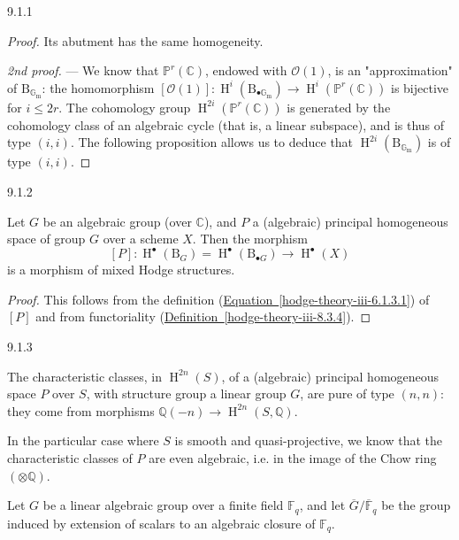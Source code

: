 \begin{theorem}{9.1.1}
\begin{proof}
      Its abutment has the same homogeneity.\par{}\emph{2nd proof.} —
      We know that \(\mathbb {P}^r(\mathbb {C})\), endowed with \(\mathcal {O}(1)\), is an "approximation" of \(\mathrm {B}_{\mathbb {G}_\mathrm {m}}\): the homomorphism \([\mathcal {O}(1)]\colon \operatorname {H}^i(\mathrm {B}_{\bullet \mathbb {G}_\mathrm {m}})\to \operatorname {H}^i(\mathbb {P}^r(\mathbb {C}))\) is bijective for \(i\leqslant  2r\).
      The cohomology group \(\operatorname {H}^{2i}(\mathbb {P}^r(\mathbb {C}))\) is generated by the cohomology class of an algebraic cycle (that is, a linear subspace), and is thus of type \((i,i)\).
      The following proposition allows us to deduce that \(\operatorname {H}^{2i}(\mathrm {B}_{\mathbb {G}_\mathrm {m}})\) is of type \((i,i)\).\end{proof}\end{theorem}\begin{proposition}{9.1.2}\label{hodge-theory-iii-9.1.2}\skipsinglepar\par{}Let \(G\) be an algebraic group (over \(\mathbb {C}\)), and \(P\) a (algebraic) principal homogeneous space of group \(G\) over a scheme \(X\).
    Then the morphism
    \[       [P]\colon \operatorname {H}^\bullet (\mathrm {B}_G)=\operatorname {H}^\bullet (\mathrm {B}_{\bullet  G})       \to  \operatorname {H}^\bullet (X)     \]
    is a morphism of mixed Hodge structures.\begin{proof}\par{}This follows from the definition (\hyperref[hodge-theory-iii-6.1.3.1]{Equation~\ref*{hodge-theory-iii-6.1.3.1}}) of \([P]\) and from functoriality (\hyperref[hodge-theory-iii-8.3.4]{Definition~\ref*{hodge-theory-iii-8.3.4}}).\end{proof}\end{proposition}\begin{corollary}{9.1.3}\label{hodge-theory-iii-9.1.3}\skipsinglepar\par{}The characteristic classes, in \(\operatorname {H}^{2n}(S)\), of a (algebraic) principal homogeneous space \(P\) over \(S\), with structure group a linear group \(G\), are pure of type \((n,n)\): they come from morphisms \(\mathbb {Q}(-n)\to \operatorname {H}^{2n}(S,\mathbb {Q})\).\end{corollary}\par{}In the particular case where \(S\) is smooth and quasi-projective, we know that the characteristic classes of \(P\) are even algebraic, i.e. in the image of the Chow ring \((\otimes \mathbb {Q})\).\label{hodge-theory-iii-9.1.4}\par{}Let \(G\) be a linear algebraic group over a finite field \(\mathbb {F}_q\), and let \(\overline {G}/\overline {\mathbb {F}}_q\) be the group induced by extension of scalars to an algebraic closure of \(\mathbb {F}_q\).
